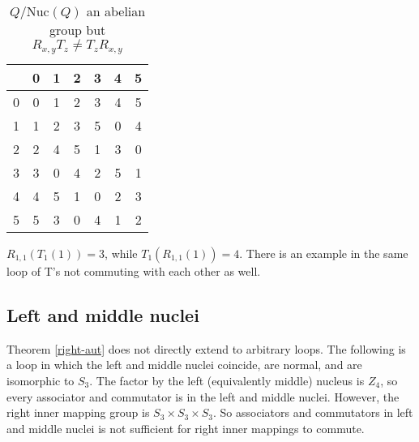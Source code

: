 \documentclass[12pt, twoside, openright]{report}
\theoremstyle{definition}
\newcommand{\nuc}{\text{Nuc}}       %
\begin{document}
\begin{table}[H]
  \centering
  \begin{tabular}{c | c c c c c c}
    & 0 & 1 & 2 & 3 & 4 & 5\\
    \hline\hline
    0 & 0 & 1 & 2 & 3 & 4 & 5\\
    1 & 1 & 2 & 3 & 5 & 0 & 4\\
    2 & 2 & 4 & 5 & 1 & 3 & 0\\
    3 & 3 & 0 & 4 & 2 & 5 & 1\\
    4 & 4 & 5 & 1 & 0 & 2 & 3\\
    5 & 5 & 3 & 0 & 4 & 1 & 2
  \end{tabular}
  \caption{$Q/\nuc(Q)$ an abelian group but $R_{x, y} T_z \neq T_z R_{x, y}$}
\end{table}

$R_{1, 1}(T_1 (1)) = 3$, while $T_1(R_{1, 1}(1)) = 4$. There is an example in the same loop
  of T's not commuting with each other as well.

\subsection{Left and middle nuclei}

Theorem \ref{right-aut} does not directly extend to arbitrary loops. The following is a loop
  in which the left and middle nuclei coincide, are normal, and are isomorphic to $S_3$.
  The factor by the left (equivalently middle) nucleus is $Z_4$, so every associator and
  commutator is in the left and middle nuclei. However, the right inner mapping group is
  $S_3 \times S_3 \times S_3$. So associators and commutators in left and middle nuclei is
  not sufficient for right inner mappings to commute.
\end{document}
